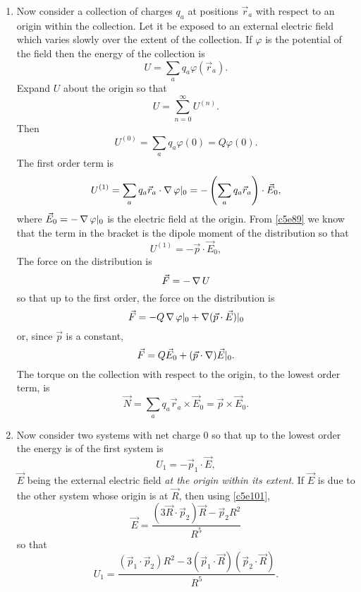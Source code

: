 \begin{enumerate}
\item Now consider a collection of charges $q_a$ at positions $\vec{r}_a$ with 
respect to an origin within the collection. Let it be exposed to an external 
electric field which varies slowly over the extent of the collection. If 
$\varphi$ is the potential of the field then the energy of the collection is
\begin{equation}\label{c5e117}
U = \sum_aq_a\varphi(\vec{r}_a).
\end{equation}
Expand $U$ about the origin so that
\begin{equation}\label{c5e118}
U = \sum_{n=0}^\infty U^{(n)}.
\end{equation}
Then 
\begin{equation}\label{c5e119}
U^{(0)} = \sum_a q_a\varphi(0) = Q\varphi(0).
\end{equation}
The first order term is
\[
U^{(1)} = \sum_a q_a\vec{r}_a\cdot\operatorname{\nabla}\varphi|_0 = 
-\left(\sum_a q_a\vec{r}_a\right)\cdot\vec{E}_0,
\]
where $\vec{E}_0 = -\operatorname{\nabla}\varphi|_0$ is the electric field at the origin. From 
\eqref{c5e89} we know that the term in the bracket is the dipole moment of the
distribution so that
\begin{equation}\label{c5e120}
U^{(1)} = -\vec{p}\cdot\vec{E}_0,
\end{equation}
The force on the distribution is
\begin{equation}\label{c5e121}
\vec{F} = -\operatorname{\nabla} U
\end{equation}
so that up to the first order, the force on the distribution is
\[
\vec{F} = -Q\operatorname{\nabla}\varphi|_0 + \operatorname{\nabla}(\vec{p}\cdot\vec{E})|_0
\]
or, since $\vec{p}$ is a constant,
\begin{equation}\label{c5e122}
\vec{F} = Q\vec{E}_0 + (\vec{p}\cdot\operatorname{\nabla})\vec{E}|_0.
\end{equation}
The torque on the collection with respect to the origin, to the lowest order 
term, is
\begin{equation}\label{c5e123}
\vec{N} = \sum_aq_a\vec{r}_a\times\vec{E}_0  = \vec{p}\times\vec{E}_0.
\end{equation}

\item Now consider two systems with net charge $0$ so that up to the lowest 
order the energy is of the first system is
\begin{equation}\label{c5e124}
U_1 = -\vec{p}_1\cdot\vec{E},
\end{equation}
$\vec{E}$ being the external electric field \emph{at the origin within its 
extent}. If $\vec{E}$ is due to the other system whose origin is at $\vec{R}$, 
then using
\eqref{c5e101},
\[
\vec{E} = \frac{(3\vec{R}\cdot\vec{p}_2)\vec{R} - \vec{p}_2R^2}{R^5}
\]
so that
\begin{equation}\label{c5e125}
U_1 = \frac{(\vec{p}_1\cdot\vec{p}_2)R^2 - 3(\vec{p}_1\cdot\vec{R})
(\vec{p}_2\cdot\vec{R})}{R^5}.
\end{equation}


\end{enumerate}
